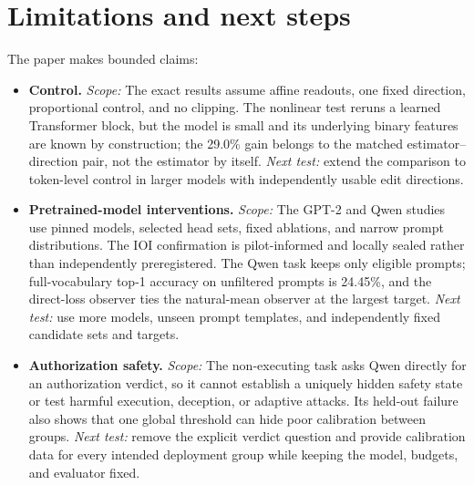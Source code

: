 \section{Limitations and next steps}
\label{sec:limitations}

The paper makes bounded claims:

\begin{itemize}
  \item \textbf{Control.} \emph{Scope:} The exact results assume affine
  readouts, one fixed direction, proportional control, and no clipping. The
  nonlinear test reruns a learned Transformer block, but the model is small and
  its underlying binary features are known by construction; the 29.0\% gain belongs to the matched
  estimator--direction pair, not the estimator by itself. \emph{Next test:} extend
  the comparison to token-level control in larger models with independently
  usable edit directions.

  \item \textbf{Pretrained-model interventions.} \emph{Scope:} The GPT-2 and
  Qwen studies use pinned models, selected head sets, fixed ablations, and narrow
  prompt distributions. The IOI confirmation is pilot-informed and locally
  sealed rather than independently preregistered. The Qwen task keeps only
  eligible prompts; full-vocabulary top-1 accuracy on unfiltered prompts is
  24.45\%, and the direct-loss observer ties the natural-mean observer at the
  largest target.
  \emph{Next test:} use more models, unseen prompt templates, and independently
  fixed candidate sets and targets.

  \item \textbf{Authorization safety.} \emph{Scope:} The non-executing task asks Qwen
  directly for an authorization verdict, so it cannot establish a uniquely
  hidden safety state or test harmful execution, deception, or adaptive attacks.
  Its held-out failure also shows that one global threshold can hide poor
  calibration between groups. \emph{Next test:} remove the explicit verdict
  question and provide calibration data for every intended deployment group
  while keeping the model, budgets, and evaluator fixed.


\end{itemize}
